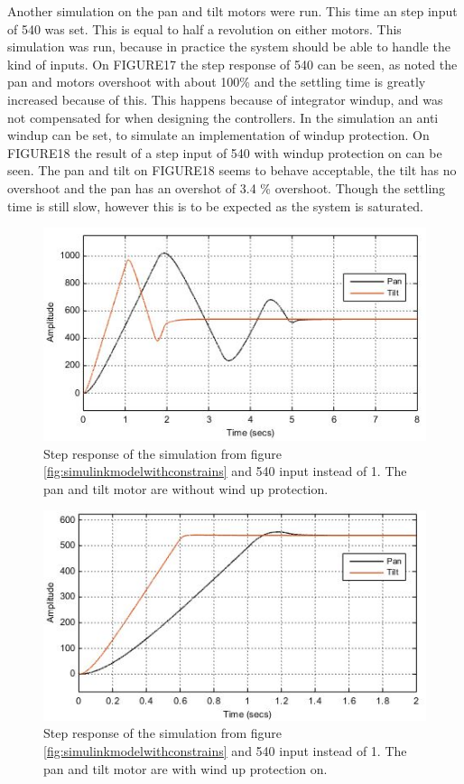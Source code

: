 Another simulation on the pan and tilt motors were run. This time an step input of 540 was set. This is equal to half a revolution on either motors. This simulation was run, because in practice the system should be able to handle the kind of inputs.
On FIGURE17 the step response of 540 can be seen, as noted the pan and motors overshoot with about 100\% and the settling time is greatly increased because of this. This happens because of integrator windup, and was not compensated for when designing the controllers. In the simulation an anti windup can be set, to simulate an implementation of windup protection. On FIGURE18 the result of a step input of 540 with windup protection on can be seen. The pan and tilt on FIGURE18 seems to behave acceptable, the tilt has no overshoot and the pan has an overshot of 3.4 \% overshoot. Though the settling time is still slow, however this is to be expected as the system is saturated.


\begin{figure}[h!]
\centering
\includegraphics[scale=0.7]{Billeder/SimuStepPanAndTiltNoWindUpProtection.jpg}
\caption{  Step response of the simulation from figure  \ref{fig:simulinkmodelwithconstrains} and 540 input instead of 1. The pan and tilt motor are without wind up protection. }
\label{fig:SimuStepPanAndTiltNoWindUpProtection}
\end{figure}


\begin{figure}[h!]
\centering
\includegraphics[scale=0.7]{Billeder/SimuStepPanAndTiltWithWindUpProtection.jpg}
\caption{   Step response of the simulation from figure \ref{fig:simulinkmodelwithconstrains} and 540 input instead of 1. The pan and tilt motor are with wind up protection on.
 }
\label{fig:SimuStepPanAndTiltWithWindUpProtection}
\end{figure}

